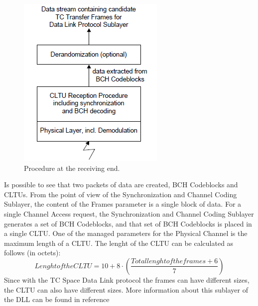 \documentclass[12pt,a4paper]{report}
\begin{document}
\begin{figure}[H]
\begin{center}
\includegraphics[scale=1]{proceduresreceivingend.PNG}  
\caption{Procedure at the receiving end.}
\end{center}
\end{figure}
Is possible to see that two packets of data are created, BCH Codeblocks and CLTUs. From the point of view of the Synchronization and Channel Coding Sublayer, the content of
the Frames parameter is a single block of data. For a single Channel Access request, the Synchronization and Channel Coding Sublayer
generates a set of BCH Codeblocks, and that set of BCH Codeblocks is placed in a single
CLTU. One of the managed parameters for the Physical Channel is the maximum length of a
CLTU. The lenght of the CLTU can be calculated as follows (in octets): 
\begin{equation}
Lenght of the CLTU=10+8\cdot(\frac{Total lenght of the frames+6}{7})
\end{equation} 
Since with the TC Space Data Link protocol the frames can have different sizes, the CLTU can also have different sizes. More information about this sublayer of the DLL can be found in reference \cite{Synchronization2012}

 
\end{document}
